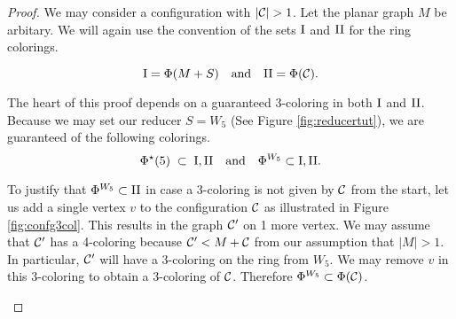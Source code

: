 \begin{proof}
We may consider a configuration with $|\mathcal{C}| > 1$. Let the planar graph $M$ be arbitary. We will again use the convention of the sets $\text{I}$ and $\text{II}$ for the ring colorings.

\begin{equation}
    \text{I} = \Phi(M+S) \quad \text{and} \quad \text{II} = \Phi(\mathcal{C}).
\end{equation}

The heart of this proof depends on a guaranteed 3-coloring in both $\text{I}$ and $\text{II}$. Because we may set our reducer $S=W_5$ (See Figure \ref{fig:reducertut}), we are guaranteed of the following colorings.
\begin{equation}
    \Phi^\star(5) \;\subset\; \text{I}, \text{II} \quad\text{and}\quad \Phi^{W_5} \subset \text{I},\text{II}.
\end{equation}

To justify that $\Phi^{W_5} \subset \text{II}$ in case a 3-coloring is not given by $\mathcal{C}$ from the start, let us add a single vertex $v$ to the configuration $\mathcal{C}$ as illustrated in Figure \ref{fig:confg3col}. This results in the graph $\mathcal{C}'$ on 1 more vertex. We may assume that $\mathcal{C}'$ has a 4-coloring because $\mathcal{C}' < M+\mathcal{C}$ from our assumption that $|M| > 1$. In particular, $\mathcal{C}'$ will have a 3-coloring on the ring from $W_5$. We may remove $v$ in this 3-coloring to obtain a 3-coloring of $\mathcal{C}$. Therefore $\Phi^{W_5} \subset \Phi(\mathcal{C})$. 

\needspace{5cm}
\begin{figure}
    \centering
\end{figure}
\end{proof}
